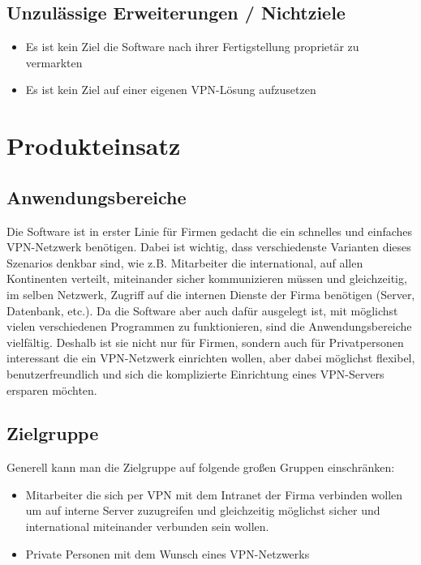 \documentclass[a4paper,12pt]{scrreprt}
\begin{document}
	\section{Unzulässige Erweiterungen / Nichtziele}
	
	\begin{itemize}
	\item Es ist kein Ziel die Software nach ihrer Fertigstellung proprietär zu vermarkten
	\item Es ist kein Ziel auf einer eigenen VPN-Lösung aufzusetzen
	
	\end{itemize}
	
	
\chapter{Produkteinsatz}
	
	\section{Anwendungsbereiche}
	 Die Software ist in erster Linie für Firmen gedacht die ein schnelles und einfaches VPN-Netzwerk benötigen. Dabei ist wichtig, dass verschiedenste Varianten dieses Szenarios denkbar sind, wie z.B. Mitarbeiter die international, auf allen Kontinenten verteilt, miteinander sicher kommunizieren müssen und gleichzeitig, im selben Netzwerk, Zugriff auf die internen Dienste der Firma benötigen (Server, Datenbank, etc.). Da die Software aber auch dafür ausgelegt ist, mit möglichst vielen verschiedenen Programmen zu funktionieren, sind die Anwendungsbereiche vielfältig. Deshalb ist sie nicht nur für Firmen, sondern auch für Privatpersonen interessant die ein VPN-Netzwerk einrichten wollen, aber dabei möglichst flexibel, benutzerfreundlich und sich die komplizierte Einrichtung eines VPN-Servers ersparen möchten. 
	 	
		
		
		
	\section{Zielgruppe}
	
	Generell kann man die Zielgruppe auf folgende großen Gruppen einschränken:
	\begin{itemize}
	\item Mitarbeiter die sich per VPN mit dem Intranet der Firma verbinden wollen um auf interne Server zuzugreifen und gleichzeitig möglichst sicher und international miteinander verbunden sein wollen.
	\item Private Personen mit dem Wunsch eines VPN-Netzwerks
	\end{itemize}
		
\end{document}

